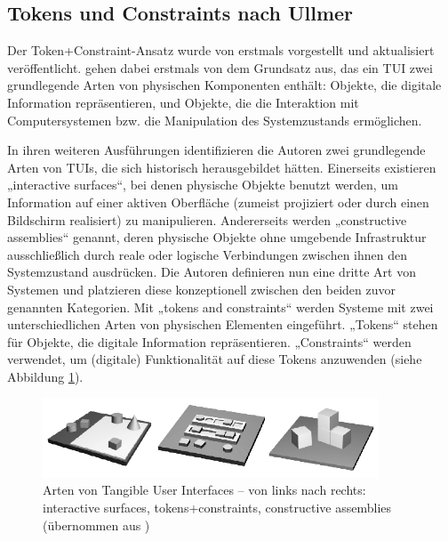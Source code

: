 
\subsection{Tokens und Constraints nach Ullmer} %
\label{sub:tokens_und_constraints_nach_ullmer}

Der Token+Constraint-Ansatz wurde von \citet{Ullmer02} erstmals vorgestellt und \citet{Ullmer05} aktualisiert veröffentlicht. \citeauthor{Ullmer05} gehen dabei erstmals von dem Grundsatz aus, das ein \gls{TUI} zwei grundlegende Arten von physischen Komponenten enthält: Objekte, die digitale Information repräsentieren, und Objekte, die die Interaktion mit Computersystemen bzw. die Manipulation des Systemzustands ermöglichen.

In ihren weiteren Ausführungen identifizieren die Autoren zwei grundlegende Arten von \glspl{TUI}, die sich historisch herausgebildet hätten. Einerseits existieren „interactive surfaces“, bei denen physische Objekte benutzt werden, um Information auf einer aktiven Oberfläche (zumeist projiziert oder durch einen Bildschirm realisiert) zu manipulieren. Andererseits werden „constructive assemblies“ genannt, deren physische Objekte ohne umgebende Infrastruktur ausschließlich durch reale oder logische Verbindungen zwischen ihnen den Systemzustand ausdrücken. Die Autoren definieren nun eine dritte Art von Systemen und platzieren diese konzeptionell zwischen den beiden zuvor genannten Kategorien. Mit „tokens and constraints“ werden Systeme mit zwei unterschiedlichen Arten von physischen Elementen eingeführt. „Tokens“ stehen für Objekte, die digitale Information repräsentieren. „Constraints“ werden verwendet, um (digitale) Funktionalität auf diese Tokens anzuwenden (siehe Abbildung \ref{fig:img_ImplementierungUeberblick_is_tac_ca}).

\begin{figure}[htbp]
	\centering
		\includegraphics[width=10cm]{img/ImplementierungUeberblick/is_tac_ca.png}
	\caption[Arten von Tangible User Interfaces]{Arten von Tangible User Interfaces -- von links nach rechts: interactive surfaces, tokens+constraints, constructive assemblies (übernommen aus \citet{Ullmer05})}
	\label{fig:img_ImplementierungUeberblick_is_tac_ca}
\end{figure}

